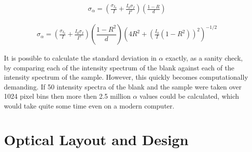     \begin{align}
      \sigma_\alpha = \left(\frac{\sigma_{I_0}}{I} +
             \frac{I_0\sigma_I}{I^2}\right)
            \left(\frac{1-R}{d}\right)\label{eq:ceas_err_std}
    \end{align}


    \begin{align}
      \sigma_\alpha = \left(\frac{\sigma_{I_0}}{I} +
             \frac{I_0\sigma_I}{I^2}\right)
            \left(\dfrac{1-R^2}{d}\right)\left(4R^2+\left(
                                     \frac{I_0}{I}(1-R^2)\right)^2
                                     \right)^{-1/2}\label{eq:ceas_err_geo}
    \end{align}

It is possible to calculate the standard deviation in $\alpha$ exactly, as
a sanity check, by comparing each of the intensity spectrum of the blank
against each of the intensity spectrum of the sample. However, this quickly
becomes computationally demanding. If 50 intensity spectra of the blank and
the sample were taken over 1024 pixel bins then more then 2.5 million $\alpha$
values could be calculated, which would take quite some time even on a modern
computer.



\section{Optical Layout and Design}\label{sec:optical_layout}


